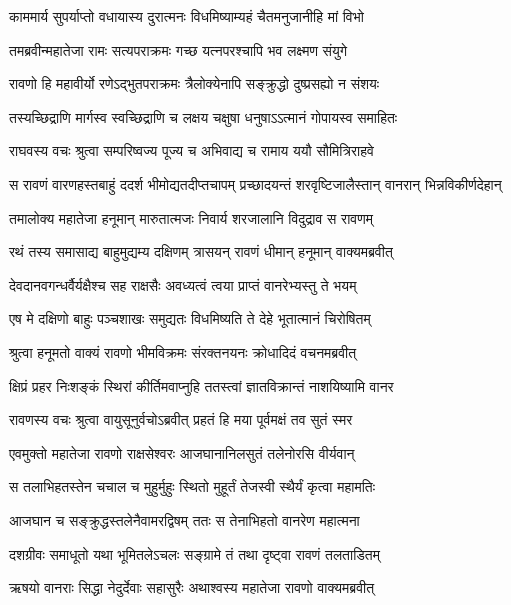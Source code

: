 \twolineshloka
{काममार्य सुपर्याप्तो वधायास्य दुरात्मनः}
{विधमिष्याम्यहं चैतमनुजानीहि मां विभो} %

\twolineshloka
{तमब्रवीन्महातेजा रामः सत्यपराक्रमः}
{गच्छ यत्नपरश्चापि भव लक्ष्मण संयुगे} %

\twolineshloka
{रावणो हि महावीर्यो रणेऽद्भुतपराक्रमः}
{त्रैलोक्येनापि सङ्क्रुद्धो दुष्प्रसह्यो न संशयः} %

\twolineshloka
{तस्यच्छिद्राणि मार्गस्व स्वच्छिद्राणि च लक्षय}
{चक्षुषा धनुषाऽऽत्मानं गोपायस्व समाहितः} %

\twolineshloka
{राघवस्य वचः श्रुत्वा सम्परिष्वज्य पूज्य च}
{अभिवाद्य च रामाय ययौ सौमित्रिराहवे} %

\twolineshloka
{स रावणं वारणहस्तबाहुं ददर्श भीमोद्यतदीप्तचापम्}
{प्रच्छादयन्तं शरवृष्टिजालैस्तान् वानरान् भिन्नविकीर्णदेहान्} %

\twolineshloka
{तमालोक्य महातेजा हनूमान् मारुतात्मजः}
{निवार्य शरजालानि विदुद्राव स रावणम्} %

\twolineshloka
{रथं तस्य समासाद्य बाहुमुद्यम्य दक्षिणम्}
{त्रासयन् रावणं धीमान् हनूमान् वाक्यमब्रवीत्} %

\twolineshloka
{देवदानवगन्धर्वैर्यक्षैश्च सह राक्षसैः}
{अवध्यत्वं त्वया प्राप्तं वानरेभ्यस्तु ते भयम्} %

\twolineshloka
{एष मे दक्षिणो बाहुः पञ्चशाखः समुद्यतः}
{विधमिष्यति ते देहे भूतात्मानं चिरोषितम्} %

\twolineshloka
{श्रुत्वा हनूमतो वाक्यं रावणो भीमविक्रमः}
{संरक्तनयनः क्रोधादिदं वचनमब्रवीत्} %

\twolineshloka
{क्षिप्रं प्रहर निःशङ्कं स्थिरां कीर्तिमवाप्नुहि}
{ततस्त्वां ज्ञातविक्रान्तं नाशयिष्यामि वानर} %

\twolineshloka
{रावणस्य वचः श्रुत्वा वायुसूनुर्वचोऽब्रवीत्}
{प्रहतं हि मया पूर्वमक्षं तव सुतं स्मर} %

\twolineshloka
{एवमुक्तो महातेजा रावणो राक्षसेश्वरः}
{आजघानानिलसुतं तलेनोरसि वीर्यवान्} %

\twolineshloka
{स तलाभिहतस्तेन चचाल च मुहुर्मुहुः}
{स्थितो मुहूर्तं तेजस्वी स्थैर्यं कृत्वा महामतिः} %

\twolineshloka
{आजघान च सङ्क्रुद्धस्तलेनैवामरद्विषम्}
{ततः स तेनाभिहतो वानरेण महात्मना} %

\twolineshloka
{दशग्रीवः समाधूतो यथा भूमितलेऽचलः}
{सङ्ग्रामे तं तथा दृष्ट्वा रावणं तलताडितम्} %

\twolineshloka
{ऋषयो वानराः सिद्धा नेदुर्देवाः सहासुरैः}
{अथाश्वस्य महातेजा रावणो वाक्यमब्रवीत्} %


